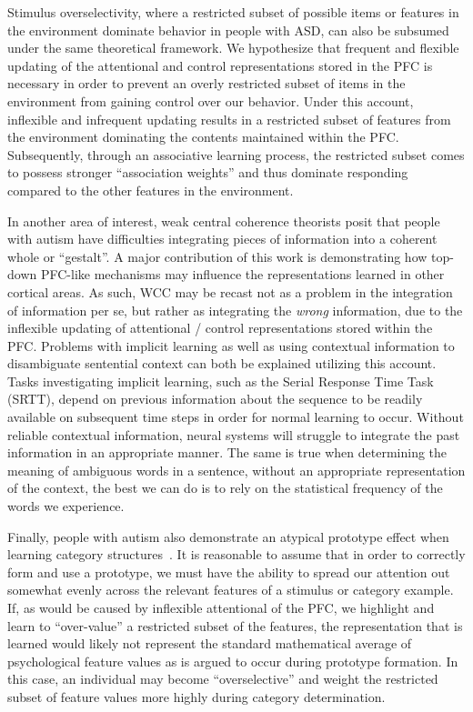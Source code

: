 Stimulus overselectivity, where a restricted subset of possible items or features in the environment dominate behavior in people with ASD, can also be subsumed under the same theoretical framework.  We hypothesize that frequent and flexible updating of the attentional and control representations stored in the PFC is necessary in order to prevent an overly restricted subset of items in the environment from gaining control over our behavior.  Under this account, inflexible and infrequent updating results in a restricted subset of features from the environment dominating the contents maintained within the PFC.  Subsequently, through an associative learning process, the restricted subset comes to possess stronger ``association weights'' and thus dominate responding compared to the other features in the environment.

In another area of interest, weak central coherence theorists posit that people with autism have difficulties integrating pieces of information into a coherent whole or ``gestalt''\cite{FrithU:1989:AutismWCC,HappeF:1999:WCC}.  A major contribution of this work is demonstrating how top-down PFC-like mechanisms may influence the representations learned in other cortical areas.  As such, WCC may be recast not as a problem in the integration of information per se, but rather as integrating the \emph{wrong} information, due to the inflexible updating of attentional / control representations stored within the PFC.   Problems with implicit learning as well as using contextual information to disambiguate sentential context can both be explained utilizing this account.  Tasks investigating implicit learning, such as the Serial Response Time Task (SRTT), depend on previous information about the sequence to be readily available on subsequent time steps in order for normal learning to occur.  Without reliable contextual information, neural systems will struggle to integrate the past information in an appropriate manner.  The same is true when determining the meaning of ambiguous words in a sentence, without an appropriate representation of the context, the best we can do is to rely on the statistical frequency of the words we experience.   

Finally, people with autism also demonstrate an atypical prototype effect when learning category structures~\cite{RefWorks:113,StraussMS:2009:Prototype}.   It is reasonable to assume that in order to correctly form and use a prototype, we must have the ability to spread our attention out somewhat evenly across the relevant features of a stimulus or category example.  If, as would be caused by inflexible attentional of the PFC, we highlight and learn to ``over-value'' a restricted subset of the features, the representation that is learned would likely not represent the standard mathematical average of psychological feature values as is argued to occur during prototype formation.  In this case, an individual may become ``overselective'' and weight the restricted subset of feature values more highly during category determination.  



